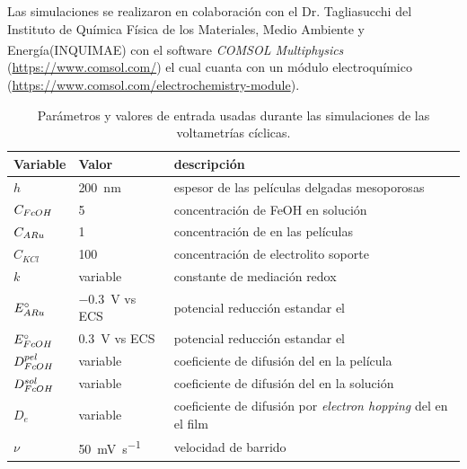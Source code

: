 	 	
	 		\pagebreak	
			
			 Las simulaciones se realizaron en colaboración con el Dr. Tagliasucchi del Instituto de Química Física de los Materiales, Medio Ambiente y Energía\linebreak  (INQUIMAE) con el software \textit{COMSOL Multiphysics\textsuperscript\textregistered} (\url{https://www.comsol.com/}) el cual cuanta con un módulo electroquímico (\url{https://www.comsol.com/electrochemistry-module}).

	    	\begin{table}[hb!]
	 	    \caption[Parámetros de las simulaciones]{Parámetros y valores de entrada usadas durante las simulaciones de las voltametrías cíclicas.}
	 	    \begin{tabular}{>{\raggedright\arraybackslash}m{1.4cm}>{\centering\arraybackslash}m{2.8cm}>{\raggedright\arraybackslash}m{6.7cm}} 
	 	    \toprule
	 	    Variable  & 	Valor  &   descripción      \\ \midrule
	 	    $h$  	  &  \hspace{-5mm} \SI{200}{nm}	& 	   espesor de las películas delgadas mesoporosas 	    \\ \midrule
	 	    $C_{\fc}$  & \SI{5}{\milli\Molar}  & concentración de FeOH en solución    \\ \midrule
	 	    $C_{\ru}$ & \SI{1}{\Molar}  & concentración de \ru\space en las películas    \\ \midrule
	 	    $C_{KCl}$ & \hspace{-5mm}  \SI{100}{\milli\Molar}  & concentración de electrolito soporte    \\ \midrule
	 	    $k$ 		   & variable 	 & 	constante de mediación redox    \\ \midrule
	 	    $E^\circ_{\ru}$  & \hspace{-3mm}\SI{-0.3}{\volt} vs ECS & potencial reducción estandar el \ru \\ \midrule
	 	    $E^\circ_{\fc}$  & \SI{0.3}{\volt} vs ECS & potencial reducción estandar el \fc \\ \midrule
	 	    $D_{\fc}^{pel} $  & variable & coeficiente de difusión del \fc\space en la película \\ \midrule
	 	    $D_{\fc}^{sol} $  & variable & coeficiente de difusión del \fc\space en la solución \\ \midrule
	 	    $D_{e}$  & variable & coeficiente de difusión por \textit{electron hopping }del \ru\space en el film \\ \midrule
	 	    $\nu$    & \hspace{3.5mm} \SI{50}{\milli\volt\per\second}  &  velocidad de barrido \\
	 	     \bottomrule
			\end{tabular}
			\label{tabla:simulacion}
			\end{table} 

			\vfill
	
